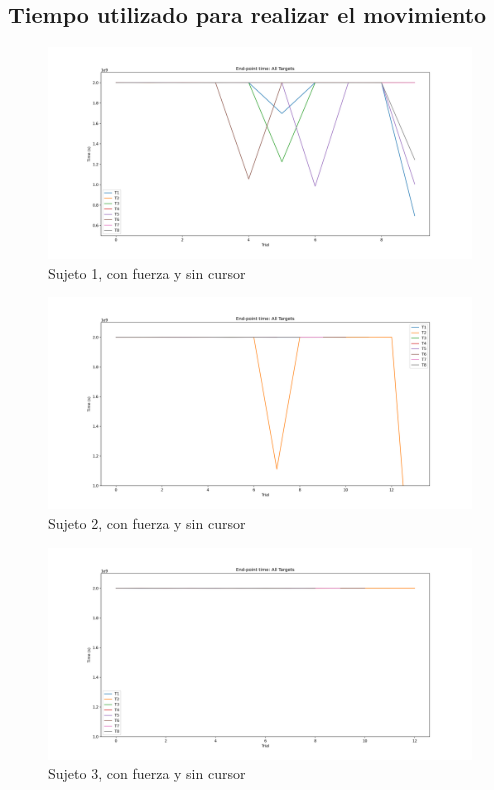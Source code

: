 \documentclass[a4paper,11pt, oneside]{book}
\begin{document}
\subsection{Tiempo utilizado para realizar el movimiento}
\label{anexo:8}
\begin{figure}[H]
	\includegraphics[width=\linewidth]{sujeto1/force_no_cursor/evolution_time}
	\caption{Sujeto 1, con  fuerza y sin cursor}
	\label{1-4-3}
\end{figure}
\begin{figure}[H]
	\includegraphics[width=\linewidth]{sujeto2/force_no_cursor/evolution_time}
	\caption{Sujeto 2, con  fuerza y sin cursor}
	\label{2-4-3}
\end{figure}
\begin{figure}[H]
	\includegraphics[width=\linewidth]{sujeto3/force_no_cursor/evolution_time}
	\caption{Sujeto 3, con  fuerza y sin cursor}
	\label{3-4-3}
\end{figure}
\end{document}
